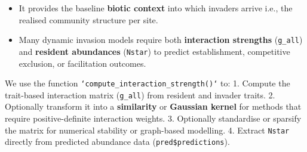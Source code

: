 \documentclass[
]{article}
\providecommand{\tightlist}{%
  \setlength{\itemsep}{0pt}\setlength{\parskip}{0pt}}
\begin{document}
\begin{itemize}
\tightlist
\item
  It provides the baseline \textbf{biotic context} into which invaders
  arrive i.e., the realised community structure per site.
\item
  Many dynamic invasion models require both \textbf{interaction
  strengths} (\texttt{g\_all}) and \textbf{resident abundances}
  (\texttt{Nstar}) to predict establishment, competitive exclusion, or
  facilitation outcomes.
\end{itemize}

We use the function \texttt{`compute_interaction_strength()`} to: 1.
Compute the trait-based interaction matrix (\texttt{g\_all}) from
resident and invader traits. 2. Optionally transform it into a
\textbf{similarity} or \textbf{Gaussian kernel} for methods that require
positive-definite interaction weights. 3. Optionally standardise or
sparsify the matrix for numerical stability or graph-based modelling. 4.
Extract \texttt{Nstar} directly from predicted abundance data
(\texttt{pred\$predictions}).
\end{document}
